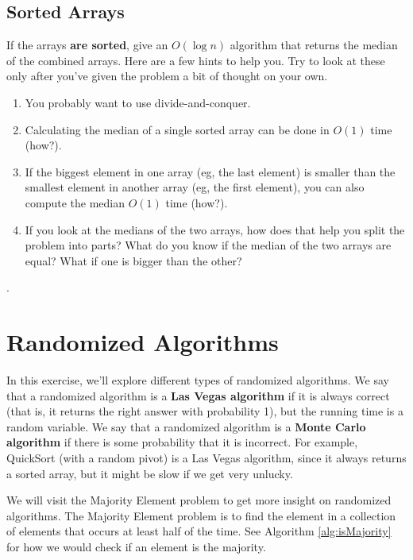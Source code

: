 \documentclass [12pt]{article}
\begin{document}
\subsection{Sorted Arrays }

If the arrays \textbf{are sorted}, give an $O(\log n)$ algorithm that returns the median of the combined arrays. Here are a few hints to help you. Try to look at these only after you've given the problem a bit of thought on your own.

\begin{enumerate}[label=Hint \arabic*]
    \item You probably want to use divide-and-conquer.
    \item Calculating the median of a single sorted array can be done in $O(1)$ time (how?).
    \item If the biggest element in one array (eg, the last element) is smaller than the smallest element in another array (eg, the first element), you can also compute the median $O(1)$ time (how?).
    \item If you look at the medians of the two arrays, how does that help you split the problem into parts? What do you know if the median of the two arrays are equal? What if one is bigger than the other?
\end{enumerate}

.

\pagebreak
\section {Randomized Algorithms } 
\label{sec:last}

In this exercise, we'll explore different types of randomized algorithms. We say that a randomized algorithm is a \textbf {Las Vegas algorithm} if it is always correct (that is, it returns the right answer with probability 1), but the running time is a random variable. We say that a randomized algorithm is a \textbf {Monte Carlo algorithm} if there is some probability that it is incorrect. For example, QuickSort (with a random pivot) is a Las Vegas algorithm, since it always returns a sorted array, but it might be slow if we get very unlucky. 

We will visit the Majority Element problem to get more insight on randomized algorithms. The Majority Element problem is to find the element in a collection of elements that occurs at least half of the time. See Algorithm \ref{alg:isMajority} for how we would check if an element is the majority.
\end{document}
